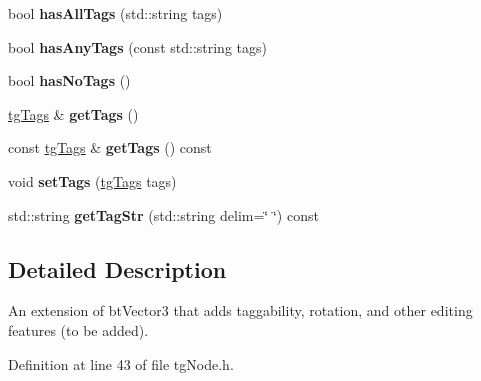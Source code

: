 \begin{DoxyCompactItemize}
\item 
\hypertarget{classtg_taggable_a33b77b1075171b63f673965687b2e844}{bool {\bfseries has\-All\-Tags} (std\-::string tags)}\label{classtg_taggable_a33b77b1075171b63f673965687b2e844}

\item 
\hypertarget{classtg_taggable_af14af28fa98021c4f20a5e8f2ddd5606}{bool {\bfseries has\-Any\-Tags} (const std\-::string tags)}\label{classtg_taggable_af14af28fa98021c4f20a5e8f2ddd5606}

\item 
\hypertarget{classtg_taggable_adff345e116e16420c701a748ff8f995f}{bool {\bfseries has\-No\-Tags} ()}\label{classtg_taggable_adff345e116e16420c701a748ff8f995f}

\item 
\hypertarget{classtg_taggable_acf1d7fa9df8f374f25015c4080902681}{\hyperlink{classtg_tags}{tg\-Tags} \& {\bfseries get\-Tags} ()}\label{classtg_taggable_acf1d7fa9df8f374f25015c4080902681}

\item 
\hypertarget{classtg_taggable_ae70d7d3b45301665bc363b0ed8b9b292}{const \hyperlink{classtg_tags}{tg\-Tags} \& {\bfseries get\-Tags} () const }\label{classtg_taggable_ae70d7d3b45301665bc363b0ed8b9b292}

\item 
\hypertarget{classtg_taggable_a5492888e4e4da4cca6261070b5726adf}{void {\bfseries set\-Tags} (\hyperlink{classtg_tags}{tg\-Tags} tags)}\label{classtg_taggable_a5492888e4e4da4cca6261070b5726adf}

\item 
\hypertarget{classtg_taggable_a346d66b066d2d9eb1eadba01da43749f}{std\-::string {\bfseries get\-Tag\-Str} (std\-::string delim=\char`\"{} \char`\"{}) const }\label{classtg_taggable_a346d66b066d2d9eb1eadba01da43749f}

\end{DoxyCompactItemize}


\subsection{Detailed Description}
An extension of bt\-Vector3 that adds taggability, rotation, and other editing features (to be added). 

Definition at line 43 of file tg\-Node.\-h.



